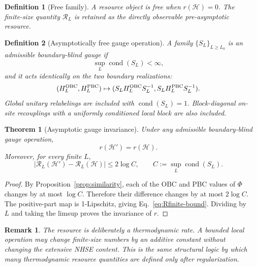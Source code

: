 \documentclass[reprint,amsmath,amssymb,aps,nofootinbib]{revtex4-2}
\newtheorem{definition}{Definition}
\newtheorem{theorem}{Theorem}
\newtheorem{remark}{Remark}
\newcommand{\cond}{\operatorname{cond}}
\newcommand{\PhiC}{\Phi}
\begin{document}
\begin{definition}[Free family]
A resource object is free when \(r(\mathscr H)=0\). The finite-size quantity
\(\mathcal R_L\) is retained as the directly observable pre-asymptotic
resource.
\end{definition}

\begin{definition}[Asymptotically free gauge operation]
A family \(\{S_L\}_{L\ge L_0}\) is an admissible boundary-blind gauge if
\begin{equation}
\sup_L\cond(S_L)<\infty,
\end{equation}
and it acts identically on the two boundary realizations:
\begin{equation}
(H_L^{\rm OBC},H_L^{\rm PBC})
\mapsto
(S_LH_L^{\rm OBC}S_L^{-1},S_LH_L^{\rm PBC}S_L^{-1}).
\end{equation}
Global unitary relabelings are included with \(\cond(S_L)=1\). Block-diagonal
on-site recouplings with a uniformly conditioned local block are also included.
\end{definition}

\begin{theorem}[Asymptotic gauge invariance]
\label{thm:gauge}
Under any admissible boundary-blind gauge operation,
\begin{equation}
\boxed{
 r(\mathscr H')=r(\mathscr H).
}
\end{equation}
Moreover, for every finite \(L\),
\begin{equation}
|\mathcal R_L(\mathscr H')-\mathcal R_L(\mathscr H)|
\le 2\log C,
\qquad
C:=\sup_L\cond(S_L).
\label{eq:Rfinite-bound}
\end{equation}
\end{theorem}

\begin{proof}
By Proposition~\ref{prop:similarity}, each of the OBC and PBC values of
\(\PhiC\) changes by at most \(\log C\). Therefore their difference changes by
at most \(2\log C\). The positive-part map is 1-Lipschitz, giving
Eq.~\eqref{eq:Rfinite-bound}. Dividing by $L$ and taking the limsup proves the
invariance of $r$.
\end{proof}

\begin{remark}
The resource is deliberately a thermodynamic rate. A bounded local operation
may change finite-size numbers by an additive constant without changing the
extensive NHSE content. This is the same structural logic by which many
thermodynamic resource quantities are defined only after regularization.
\end{remark}
\end{document}
